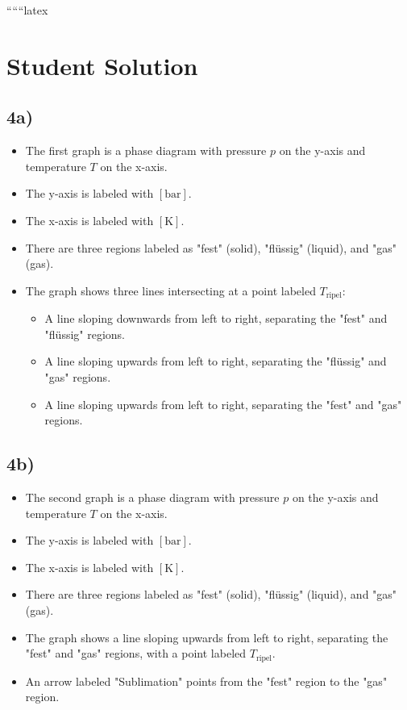 
``````latex


\section*{Student Solution}

\subsection*{4a)}

\begin{itemize}
    \item The first graph is a phase diagram with pressure \( p \) on the y-axis and temperature \( T \) on the x-axis.
    \item The y-axis is labeled with \([ \text{bar} ]\).
    \item The x-axis is labeled with \([ \text{K} ]\).
    \item There are three regions labeled as "fest" (solid), "flüssig" (liquid), and "gas" (gas).
    \item The graph shows three lines intersecting at a point labeled \( T_{\text{ripel}} \):
        \begin{itemize}
            \item A line sloping downwards from left to right, separating the "fest" and "flüssig" regions.
            \item A line sloping upwards from left to right, separating the "flüssig" and "gas" regions.
            \item A line sloping upwards from left to right, separating the "fest" and "gas" regions.
        \end{itemize}
\end{itemize}

\subsection*{4b)}

\begin{itemize}
    \item The second graph is a phase diagram with pressure \( p \) on the y-axis and temperature \( T \) on the x-axis.
    \item The y-axis is labeled with \([ \text{bar} ]\).
    \item The x-axis is labeled with \([ \text{K} ]\).
    \item There are three regions labeled as "fest" (solid), "flüssig" (liquid), and "gas" (gas).
    \item The graph shows a line sloping upwards from left to right, separating the "fest" and "gas" regions, with a point labeled \( T_{\text{ripel}} \).
    \item An arrow labeled "Sublimation" points from the "fest" region to the "gas" region.
\end{itemize}


